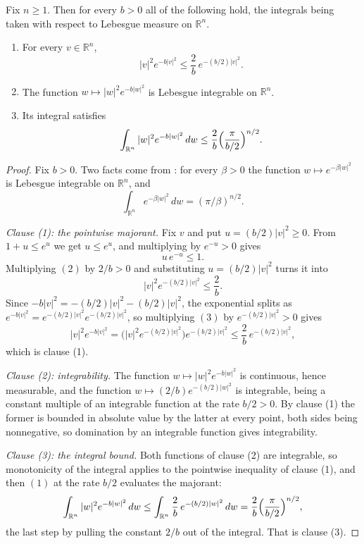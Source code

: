 \begin{lemma}
Fix $n \geq 1$.  Then for every $b > 0$ all of the following hold, the integrals
being taken with respect to Lebesgue measure on $\mathbb{R}^n$.
\begin{enumerate}
  \item For every $v \in \mathbb{R}^n$,
    \[
      |v|^2e^{-b|v|^2} \leq \frac2b\,e^{-(b/2)|v|^2} .
    \]
  \item The function $w \mapsto |w|^2e^{-b|w|^2}$ is Lebesgue integrable on
    $\mathbb{R}^n$.
  \item Its integral satisfies
    \[
      \int_{\mathbb{R}^n}|w|^2e^{-b|w|^2}\,dw
        \leq \frac2b\Bigl(\frac{\pi}{b/2}\Bigr)^{n/2} .
    \]
\end{enumerate}
\end{lemma}
\begin{proof}
Fix $b > 0$.  Two facts come from : for every
$\beta > 0$ the function $w \mapsto e^{-\beta|w|^2}$ is Lebesgue integrable on
$\mathbb{R}^n$, and
\begin{equation*}
  \int_{\mathbb{R}^n} e^{-\beta|w|^2}\,dw = (\pi/\beta)^{n/2} . \tag{1}
\end{equation*}

\emph{Clause (1): the pointwise majorant.}
Fix $v$ and put $u = (b/2)|v|^2 \geq 0$.  From $1+u \leq e^u$ we get $u \leq e^u$,
and multiplying by $e^{-u} > 0$ gives
\begin{equation*}
  u\,e^{-u} \leq 1 . \tag{2}
\end{equation*}
Multiplying $(2)$ by $2/b > 0$ and substituting $u = (b/2)|v|^2$ turns it into
\begin{equation*}
  |v|^2e^{-(b/2)|v|^2} \leq \frac2b . \tag{3}
\end{equation*}
Since $-b|v|^2 = -(b/2)|v|^2 - (b/2)|v|^2$, the exponential splits as
$e^{-b|v|^2} = e^{-(b/2)|v|^2}e^{-(b/2)|v|^2}$, so multiplying $(3)$ by
$e^{-(b/2)|v|^2} > 0$ gives
\[
  |v|^2e^{-b|v|^2} = \bigl(|v|^2e^{-(b/2)|v|^2}\bigr)e^{-(b/2)|v|^2}
    \leq \frac2b\,e^{-(b/2)|v|^2} ,
\]
which is clause (1).

\emph{Clause (2): integrability.}
The function $w \mapsto |w|^2e^{-b|w|^2}$ is continuous, hence measurable, and the
function $w \mapsto (2/b)e^{-(b/2)|w|^2}$ is integrable, being a constant multiple
of an integrable function at the rate $b/2 > 0$.  By clause (1) the former is
bounded in absolute value by the latter at every point, both sides being
nonnegative, so domination by an integrable function gives integrability.

\emph{Clause (3): the integral bound.}
Both functions of clause (2) are integrable, so monotonicity of the integral
applies to the pointwise inequality of clause (1), and then $(1)$ at the rate
$b/2$ evaluates the majorant:
\[
  \int_{\mathbb{R}^n}|w|^2e^{-b|w|^2}\,dw
    \leq \int_{\mathbb{R}^n}\frac2b\,e^{-(b/2)|w|^2}\,dw
    = \frac2b\Bigl(\frac{\pi}{b/2}\Bigr)^{n/2} ,
\]
the last step by pulling the constant $2/b$ out of the integral.  That is
clause (3).
\end{proof}
